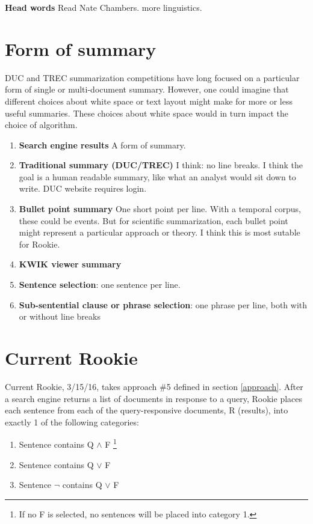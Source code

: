\documentclass[11pt]{article}
\begin{document}
\textbf{Head words} Read Nate Chambers. more linguistics.

\section{Form of summary}

DUC and TREC summarization competitions have long focused on a particular form of single or multi-document summary. However, one could imagine that different choices about white space or text layout might make for more or less useful summaries. These choices about white space would in turn impact the choice of algorithm.

\begin{enumerate}\label{approach}
  \item \textbf{Search engine results} A form of summary.
  \item \textbf{Traditional summary (DUC/TREC)} I think: no line breaks. I think the goal is a human readable summary, like what an analyst would sit down to write. DUC website requires login. 
  \item \textbf{Bullet point summary} One short point per line. With a temporal corpus, these could be events. But for scientific summarization, each bullet point might represent a particular approach or theory. I think this is most sutable for Rookie.
  \item \textbf{KWIK viewer summary}
  \item \textbf{Sentence selection}: one sentence per line.
  \item \textbf{Sub-sentential clause or phrase selection}: one phrase per line, both with or without line breaks
\end{enumerate}

\section{Current Rookie}

Current Rookie, 3/15/16, takes approach \#5 defined in section \ref{approach}. After a search engine returns a list of documents in response to a query, Rookie places each sentence from each of the query-responsive documents, R (results), into exactly 1 of the following categories: 

\begin{enumerate}
  \item Sentence contains Q $\land$ F \footnote{If no F is selected, no sentences will be placed into category 1.}
  \item Sentence contains Q $\lor$ F
  \item Sentence $\neg$ contains Q $\lor$ F
\end{enumerate}
\end{document}
